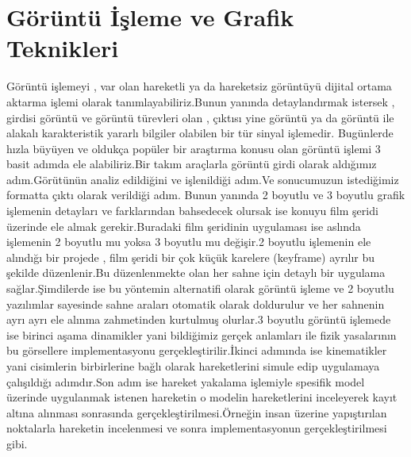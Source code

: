 \documentclass[12pt]{article}
\begin{document}
\section{Görüntü İşleme ve Grafik Teknikleri}
Görüntü işlemeyi , var olan hareketli ya da hareketsiz görüntüyü
dijital ortama aktarma işlemi olarak tanımlayabiliriz.Bunun yanında detaylandırmak
istersek , girdisi görüntü ve görüntü türevleri olan , çıktısı yine görüntü ya da
görüntü ile alakalı karakteristik yararlı bilgiler olabilen bir tür sinyal işlemedir.
Bugünlerde hızla büyüyen ve oldukça popüler bir araştırma konusu olan
görüntü işlemi 3 basit adımda ele alabiliriz.Bir takım araçlarla görüntü girdi
olarak aldığımız adım.Görütünün analiz edildiğini ve işlenildiği adım.Ve sonucumuzun
istediğimiz formatta çıktı olarak verildiği adım.
Bunun yanında 2 boyutlu ve 3 boyutlu grafik işlemenin detayları ve farklarından
bahsedecek olursak ise konuyu film şeridi üzerinde ele almak gerekir.Buradaki
film şeridinin uygulaması ise aslında işlemenin 2 boyutlu mu yoksa 3 boyutlu mu
değişir.2 boyutlu işlemenin ele alındığı bir projede , film şeridi
bir çok küçük karelere (keyframe) ayrılır bu şekilde düzenlenir.Bu düzenlenmekte
olan her sahne için detaylı bir uygulama sağlar.Şimdilerde ise bu yöntemin alternatifi
olarak görüntü işleme ve 2 boyutlu yazılımlar sayesinde sahne araları otomatik olarak
doldurulur ve her sahnenin ayrı ayrı ele alınma zahmetinden kurtulmuş olurlar.3 boyutlu
görüntü işlemede ise birinci aşama dinamikler yani bildiğimiz gerçek anlamları ile
fizik yasalarının bu görsellere implementasyonu gerçekleştirilir.İkinci adımında ise
kinematikler yani cisimlerin birbirlerine bağlı olarak hareketlerini simule edip
uygulamaya çalışıldığı adımdır.Son adım ise hareket yakalama işlemiyle spesifik model üzerinde
uygulanmak istenen hareketin o modelin hareketlerini inceleyerek kayıt altına alınması
sonrasında gerçekleştirilmesi.Örneğin insan üzerine yapıştırılan noktalarla hareketin incelenmesi
ve sonra implementasyonun gerçekleştirilmesi gibi.
\end{document}
